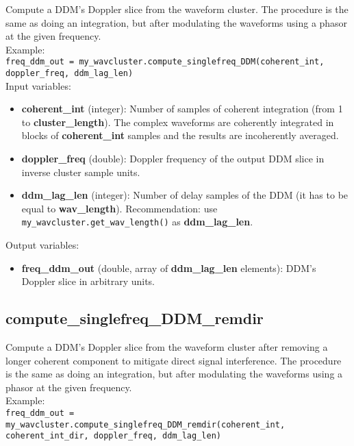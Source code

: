 Compute a DDM's Doppler slice from the waveform cluster. The procedure is the same as doing an integration, but after modulating the waveforms using a phasor at the given frequency.\\

Example:\\

\texttt{freq\_ddm\_out = my\_wavcluster.compute\_singlefreq\_DDM(coherent\_int, doppler\_freq, ddm\_lag\_len)}\\

Input variables:
\begin{itemize}
\item {\bf coherent\_int} (integer): Number of samples of coherent integration (from 1 to {\bf cluster\_length}). The complex waveforms are coherently integrated in blocks of {\bf coherent\_int} samples and the results are incoherently averaged.
\item {\bf doppler\_freq} (double): Doppler frequency of the output DDM slice in inverse cluster sample units.
\item {\bf ddm\_lag\_len} (integer): Number of delay samples of the DDM (it has to be equal to {\bf wav\_length}). Recommendation: use \texttt{my\_wavcluster.get\_wav\_length()} as {\bf ddm\_lag\_len}.
\end{itemize}

Output variables:
\begin{itemize}
\item {\bf freq\_ddm\_out} (double, array of {\bf ddm\_lag\_len} elements): DDM's Doppler slice in arbitrary units.
\end{itemize}


\subsection{compute\_singlefreq\_DDM\_remdir}

Compute a DDM's Doppler slice from the waveform cluster after removing a longer coherent component to mitigate direct signal interference. The procedure is the same as doing an integration, but after modulating the waveforms using a phasor at the given frequency.\\

Example:\\

\texttt{freq\_ddm\_out = my\_wavcluster.compute\_singlefreq\_DDM\_remdir(coherent\_int, coherent\_int\_dir, doppler\_freq, ddm\_lag\_len)}\\

